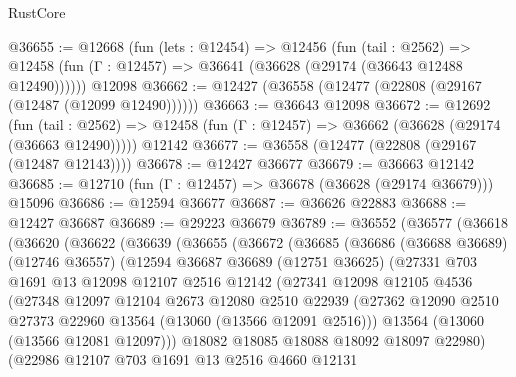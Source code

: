 \begin{lexlean}{RustCore}
\begin{coremodule}
@36655 := @12668
    (fun (lets : @12454) =>
    @12456
      (fun (tail : @2562) =>
      @12458 (fun (Γ : @12457) => @36641 (@36628 (@29174 (@36643 @12488 @12490))))))
    @12098
@36662 := @12427 (@36558 (@12477 (@22808 (@29167 (@12487 (@12099 @12490))))))
@36663 := @36643 @12098
@36672 := @12692
    (fun (tail : @2562) => @12458 (fun (Γ : @12457) => @36662 (@36628 (@29174 (@36663 @12490)))))
    @12142
@36677 := @36558 (@12477 (@22808 (@29167 (@12487 @12143))))
@36678 := @12427 @36677
@36679 := @36663 @12142
@36685 := @12710 (fun (Γ : @12457) => @36678 (@36628 (@29174 @36679))) @15096
@36686 := @12594 @36677
@36687 := @36626 @22883
@36688 := @12427 @36687
@36689 := @29223 @36679
@36789 := @36552
    (@36577
      (@36618
        (@36620
          (@36622
            (@36639
              (@36655
                (@36672
                  (@36685
                    (@36686
                      (@36688 @36689)
                      (@12746 @36557)
                      (@12594
                        @36687
                        @36689
                        (@12751 @36625)
                        (@27331
                          @703
                          @1691
                          @13
                          @12098
                          @12107
                          @2516
                          @12142
                          (@27341
                            @12098
                            @12105
                            @4536
                            (@27348
                              @12097
                              @12104
                              @2673
                              @12080
                              @2510
                              @22939
                              (@27362
                                @12090
                                @2510
                                @27373
                                @22960
                                @13564
                                (@13060 (@13566 @12091 @2516)))
                              @13564
                              (@13060 (@13566 @12081 @12097)))
                            @18082
                            @18085
                            @18088
                            @18092
                            @18097
                            @22980)
                          (@22986
                            @12107
                            @703
                            @1691
                            @13
                            @2516
                            @4660
                            @12131

\end{coremodule}
\end{lexlean}
